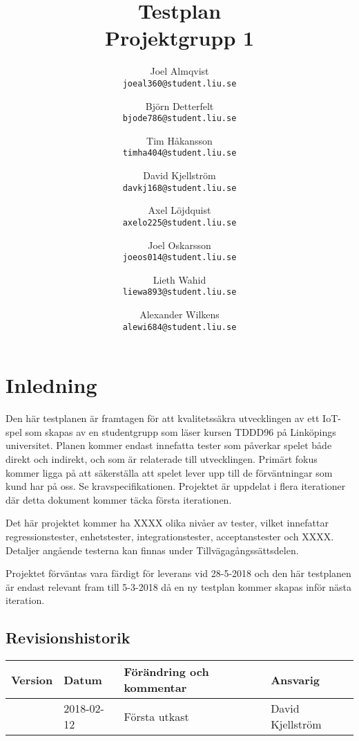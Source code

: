 \documentclass[10pt]{article}
\title{Testplan\\
  \large Projektgrupp 1}
\author{
    Joel Almqvist\\
    \texttt{joeal360@student.liu.se}
    \and
    Björn Detterfelt\\
    \texttt{bjode786@student.liu.se}
    \and
    Tim Håkansson\\
    \texttt{timha404@student.liu.se}
    \and
    David Kjellström\\
    \texttt{davkj168@student.liu.se}
    \and
    Axel Löjdquist\\
    \texttt{axelo225@student.liu.se}
    \and
    Joel Oskarsson\\
    \texttt{joeos014@student.liu.se}
    \and
    Lieth Wahid\\
    \texttt{liewa893@student.liu.se}
    \and
    Alexander Wilkens\\
    \texttt{alewi684@student.liu.se}
}
\begin{document}
\maketitle
\pagebreak
\tableofcontents
\pagebreak
{}
\section{Inledning}
	Den här testplanen är framtagen för att kvalitetssäkra utvecklingen av ett IoT-spel som skapas av en studentgrupp som läser kursen TDDD96 på Linköpings universitet. Planen kommer endast innefatta tester som påverkar spelet både direkt och indirekt, och som är relaterade till utvecklingen. Primärt fokus kommer ligga på att säkerställa att spelet lever upp till de förväntningar som kund har på oss. Se kravspecifikationen. Projektet är uppdelat i flera iterationer där detta dokument kommer täcka första iterationen.

Det här projektet kommer ha {\color{red}XXXX} olika nivåer av tester, vilket innefattar regressionstester, enhetstester, integrationstester, acceptanstester och {\color{red}XXXX}. Detaljer angående testerna kan finnas under Tillvägagångssättsdelen.

Projektet förväntas vara färdigt för leverans vid {\color{red}28-5-2018} och den här testplanen är endast relevant fram till {\color{red}5-3-2018} då en ny testplan kommer skapas inför nästa iteration.

	\subsection{Revisionshistorik}

	
	\begin{center}
 	   \begin{tabular}{| l | l | l |  l | }
 	       \hline
 	       \textbf{Version} & \textbf{Datum} & \textbf{Förändring och kommentar} & \textbf{Ansvarig} \\
 	       \hline
 	       \centering 0.1 & 2018-02-12 & Första utkast & David Kjellström\\
 	       \hline
 	   \end{tabular}
	\end{center}
\end{document}
